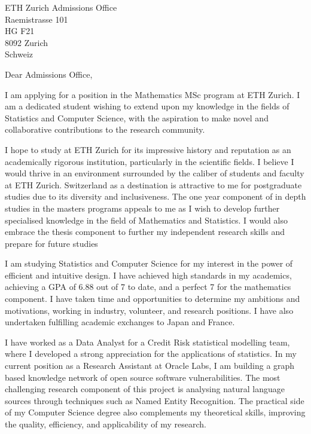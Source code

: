 
\noindent
ETH Zurich Admissions Office\\
Raemistrasse 101\\
HG F21\\
8092 Zurich\\
Schweiz\\
\vspace*{20pt}

\noindent
Dear Admissions Office,
\vspace*{10pt}


I am applying for a position in the Mathematics MSc program at ETH Zurich. I am a dedicated student wishing to extend upon my knowledge in the fields of Statistics and Computer Science, with the aspiration to make novel and collaborative contributions to the research community. 
\vspace*{10pt}

I hope to study at ETH Zurich for its impressive history and reputation as an academically rigorous institution, particularly in the scientific fields. I believe I would thrive in an environment surrounded by the caliber of students and faculty at ETH Zurich. Switzerland as a destination is attractive to me for postgraduate studies due to its diversity and inclusiveness. The one year component of in depth studies in the masters programs appeals to me as I wish to develop further specialised knowledge in the field of Mathematics and Statistics. I would also embrace the thesis component to further my independent research skills and prepare for future studies
\vspace*{10pt}

I am studying Statistics and Computer Science for my interest in the power of efficient and intuitive design. I have achieved high standards in my academics, achieving a GPA of 6.88 out of 7 to date, and a perfect 7 for the mathematics component. I have taken time and opportunities to determine my ambitions and motivations, working in industry, volunteer, and research positions. I have also undertaken fulfilling academic exchanges to Japan and France.
\vspace*{10pt}

I have worked as a Data Analyst for a Credit Risk statistical modelling team, where I developed a strong appreciation for the applications of statistics. In my current position as a Research Assistant at Oracle Labs, I am building a graph based knowledge network of open source software vulnerabilities. The most challenging research component of this project is analysing natural language sources through techniques such as Named Entity Recognition. The practical side of my Computer Science degree also complements my theoretical skills, improving the quality, efficiency, and applicability of my research.
\vspace*{10pt}

